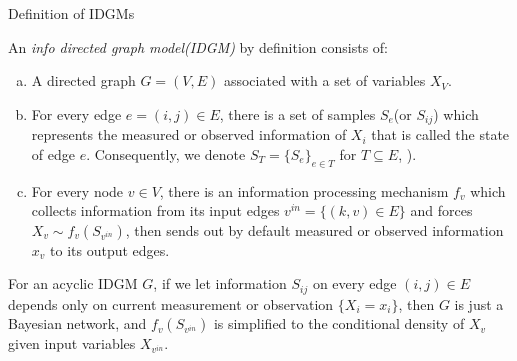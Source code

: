 \documentclass[10pt]{beamer}
\begin{document}
\begin{CJK*}{UTF8}{gbsn}
\begin{frame}{Definition of IDGMs}
\begin{definition}
    An \emph{info directed graph model(IDGM)} by definition consists of:
    \begin{enumerate}[a)]
        \item  A directed graph $G = (V, E)$ associated with a set of variables $X_V$. 
        \item  For every edge $e=(i, j) \in E$, there is a set of samples $S_e$(or $S_{ij}$) which represents the measured or observed information of $X_i$ that is called the state of edge $e$. Consequently, we denote $S_T = \{S_e\}_{e \in T}$ for $T\subseteq E$,  ). 
        \item  For every node $v \in V$, there is an information processing mechanism $f_v$ which collects information from its input edges $v^{in} = \{(k, v) \in E \}$ and forces $X_v \sim f_v(S_{v^{in}})$, then sends out by default measured or observed information $x_v$ to its output edges. 
    \end{enumerate}  
\end{definition}


For an acyclic IDGM $G$, if we let information $S_{ij}$ on every edge $(i, j) \in E$ depends only on current measurement or observation $\{X_i = x_i\}$, then $G$ is just a Bayesian network, and $f_v(S_{v^{in}})$ is simplified to the conditional density of $X_v$ given input variables $X_{v^{in}}$.

\end{frame}


\end{CJK*}
\end{document}
